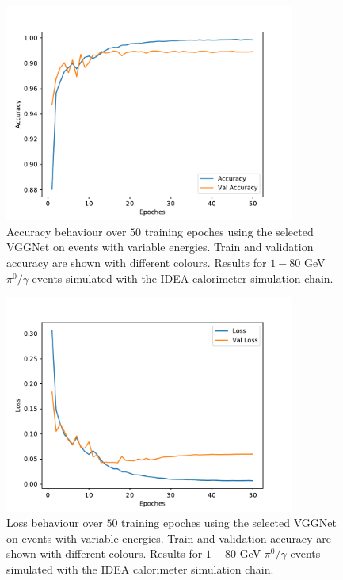 \begin{figure}
	\centering
	\includegraphics[width=0.85\textwidth]{IMG/Cap6/VGG_ERange_accuracy.pdf}
	\caption{Accuracy behaviour over $50$ training epoches using the selected VGGNet on events with variable energies. Train and validation accuracy are shown with different colours. Results for $1-80$ GeV $\pi^0/\gamma$ events simulated with the IDEA calorimeter simulation chain.}
	\label{fig:VGGNet_acc_ERange}
\end{figure}

\begin{figure}
	\centering
	\includegraphics[width=0.85\textwidth]{IMG/Cap6/VGG_ERange_Loss.pdf}
	\caption{Loss behaviour over $50$ training epoches using the selected VGGNet on events with variable energies. Train and validation accuracy are shown with different colours. Results for $1-80$ GeV $\pi^0/\gamma$ events simulated with the IDEA calorimeter simulation chain.}
	\label{fig:VGGNet_loss_ERange}
\end{figure}

